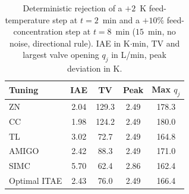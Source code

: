 \begin{table}[t]
\centering
\footnotesize
\setlength{\tabcolsep}{3pt}
\caption{Deterministic rejection of a $+2$~K feed-temperature step at $t = 2$~min and a $+10\%$ feed-concentration step at $t = 8$~min ($15$~min, no noise, directional rule). IAE in K$\cdot$min, TV and largest valve opening $q_j$ in L/min, peak deviation in K.}
\label{tab:load}
\begin{tabular}{lcccc}
\toprule
Tuning & IAE & TV & Peak & Max \(q_j\) \\
\midrule
ZN & 2.04 & 129.3 & 2.49 & 178.3 \\
CC & 1.98 & 124.2 & 2.49 & 180.0 \\
TL & 3.02 & 72.7 & 2.49 & 164.8 \\
AMIGO & 2.42 & 88.3 & 2.49 & 171.0 \\
SIMC & 5.70 & 62.4 & 2.86 & 162.4 \\
Optimal ITAE & 2.43 & 76.0 & 2.49 & 166.4 \\
\bottomrule
\end{tabular}
\end{table}
